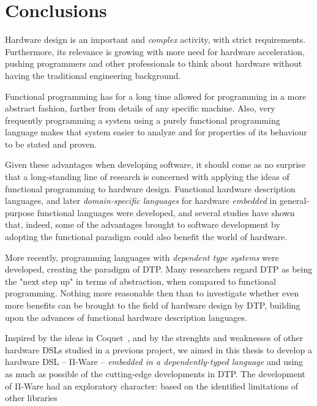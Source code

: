 \chapter{Conclusions}
\label{chap:conclusions}

    Hardware design is an important and \emph{complex} activity, with strict requirements.
    Furthermore, its relevance is growing with more need for hardware acceleration,
    pushing programmers and other professionals to think about hardware without having
    the traditional engineering background.

    Functional programming has for a long time allowed for programming in a more
    abstract fashion, farther from details of any specific machine.
    Also, very frequently programming a system using a purely functional programming language
    makes that system easier to analyze and for properties of its behaviour to be stated and proven.

    Given these advantages when developing software, it should come as no surprise that
    a long-standing line of research is concerned with applying the ideas of functional
    programming to hardware design.
    Functional hardware description languages, and later \emph{domain-specific languages}
    for hardware \emph{embedded} in general-purpose functional languages were developed,
    and several studies have shown that, indeed, some of the advantages brought to software development
    by adopting the functional paradigm could also benefit the world of hardware.

    More recently, programming languages with \emph{dependent type systems} were developed,
    creating the paradigm of \acl{DTP}.
    Many researchers regard \ac{DTP} as being the "next step up" in terms of abstraction,
    when compared to functional programming.
    Nothing more reasonable then than to investigate whether even more benefits can be brought to
    the field of hardware design by \ac{DTP},
    building upon the advances of functional hardware description languages.

    Inspired by the ideas in Coquet~\cite{coquet2011}, and by the strenghts and weaknesses of other
    hardware \acp{DSL} studied in a previous project, we aimed in this thesis to develop
    a hardware \ac{DSL} – Π-Ware – \emph{embedded in a dependently-typed language} and using
    as much as possible of the cutting-edge developments in \ac{DTP}.
    The development of Π-Ware had an exploratory character: based on the identified limitations of
    other libraries

